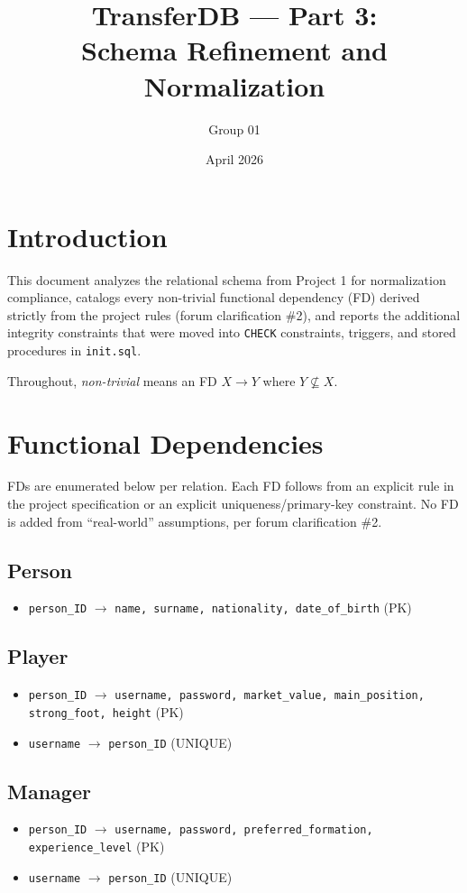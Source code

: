 \documentclass[11pt]{article}
\title{TransferDB --- Part 3:\\Schema Refinement and Normalization}
\author{Group 01}
\date{April 2026}
\begin{document}
\maketitle

\section{Introduction}

This document analyzes the relational schema from Project 1 for
normalization compliance, catalogs every non-trivial functional
dependency (FD) derived strictly from the project rules (forum
clarification \#2), and reports the additional integrity constraints
that were moved into \texttt{CHECK} constraints, triggers, and stored
procedures in \texttt{init.sql}.

Throughout, \emph{non-trivial} means an FD $X \to Y$ where $Y \not\subseteq X$.

\section{Functional Dependencies}

FDs are enumerated below per relation. Each FD follows from an explicit
rule in the project specification or an explicit uniqueness/primary-key
constraint. No FD is added from ``real-world'' assumptions, per forum
clarification \#2.

\subsection*{Person}
\begin{itemize}[leftmargin=*]
  \item \texttt{person\_ID} $\to$ \texttt{name, surname, nationality, date\_of\_birth} \hfill (PK)
\end{itemize}

\subsection*{Player}
\begin{itemize}[leftmargin=*]
  \item \texttt{person\_ID} $\to$ \texttt{username, password, market\_value, main\_position, strong\_foot, height} \hfill (PK)
  \item \texttt{username} $\to$ \texttt{person\_ID} \hfill (UNIQUE)
\end{itemize}

\subsection*{Manager}
\begin{itemize}[leftmargin=*]
  \item \texttt{person\_ID} $\to$ \texttt{username, password, preferred\_formation, experience\_level} \hfill (PK)
  \item \texttt{username} $\to$ \texttt{person\_ID} \hfill (UNIQUE)
\end{itemize}
\end{document}

